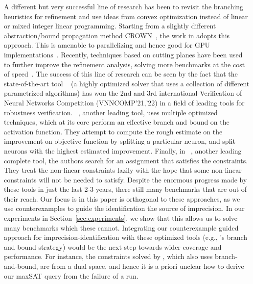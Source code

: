 

\medskip

{A different but very successful line of research has been to revisit the branching heuristics for refinement and 
use ideas from convex optimization instead of linear or mixed integer linear programming. Starting from a slightly 
different abstraction/bound propagation method CROWN~\cite{zhang2018efficient}, the work in \cite{wang2021beta} 
adopts this approach. This is amenable to parallelizing and hence good for GPU implementations~\cite{xu2020fast}. 
Recently, techniques based on cutting planes have been used to further improve the refinement analysis, solving more benchmarks 
at the cost of speed~\cite{zhang2022general}. The success of this line of research can be seen by the fact that the 
state-of-the-art tool \alphabeta{}~\cite{alphabetacrown} (a highly optimized solver that uses a collection of different 
parametrized algorithms) has won the 2nd and 3rd international Verification of Neural Networks Competition (VNNCOMP'21,'22) 
in a field of leading tools for robustness verification. \ovaltool{}~\cite{bunel2020branch}, 
another leading tool, uses multiple optimized techniques, which at its core perform an effective branch and bound on 
the \relu{} activation function. They attempt to compute the rough estimate on the improvement on objective function by 
splitting a particular neuron, and split neurons with the highest estimated improvement. 
Finally, in \marabou{}~\cite{katz2019marabou}, another leading complete tool, the authors search for an assignment that 
satisfies the constraints. They treat the non-linear constraints lazily with the hope that some non-linear constraints 
will not be needed to satisfy. Despite the enormous progress made by these tools in just the last 2-3 years, 
there still many benchmarks that are out of their reach. %
Our focus is in this paper is orthogonal to these approaches, as we use counterexamples to guide the identification 
the source of imprecision. In our experiments in Section~\ref{sec:experiments}, 
we show that this allows us to solve many benchmarks which these cannot. 
Integrating our counterexample guided approach for imprecision-identification with these optimized 
tools (e.g., \alphabeta{}'s branch and bound strategy) would be the next step 
towards wider coverage and performance. For instance, the constraints solved by 
\alphabeta{}, which also uses branch-and-bound, are from a dual space, and hence it is a priori unclear how to derive 
our maxSAT query from the failure of a run.

}
